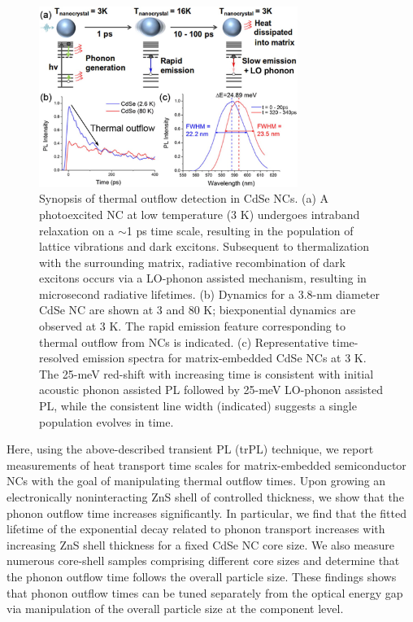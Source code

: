 \begin{figure}
\begin{center}
\includegraphics[width=0.75\textwidth]{./Chapter5/plevel1.jpeg}
\caption[Synopsis of thermal outflow detection in CdSe NCs.]{Synopsis of thermal outflow detection in CdSe NCs. (a) A photoexcited NC at low temperature (3 K) undergoes intraband relaxation on a $\sim$1 ps time scale, resulting in the population of lattice vibrations and dark excitons. Subsequent to thermalization with the surrounding matrix, radiative recombination of dark excitons occurs via a LO-phonon assisted mechanism, resulting in microsecond radiative lifetimes. (b) Dynamics for a 3.8-nm diameter CdSe NC are shown at 3 and 80 K; biexponential dynamics are observed at 3 K. The rapid emission feature corresponding to thermal outflow from NCs is indicated. (c) Representative time-resolved emission spectra for matrix-embedded CdSe NCs at 3 K. The 25-meV red-shift with increasing time is consistent with initial acoustic phonon assisted PL followed by 25-meV LO-phonon assisted PL, while the consistent line width (indicated) suggests a single population evolves in time.}
\label{f:plevel1}
\end{center}
\end{figure}

Here, using the above-described transient PL (trPL) technique, we report measurements of heat transport time scales for matrix-embedded semiconductor NCs with the goal of manipulating thermal outflow times. Upon growing an electronically noninteracting ZnS shell of controlled thickness, we show that the phonon outflow time increases significantly. In particular, we find that the fitted lifetime of the exponential decay related to phonon transport increases with increasing ZnS shell thickness for a fixed CdSe NC core size. We also measure numerous core-shell samples comprising different core sizes and determine that the phonon outflow time follows the overall particle size. These findings shows that phonon outflow times can be tuned separately from the optical energy gap via manipulation of the overall particle size at the component level. \par

